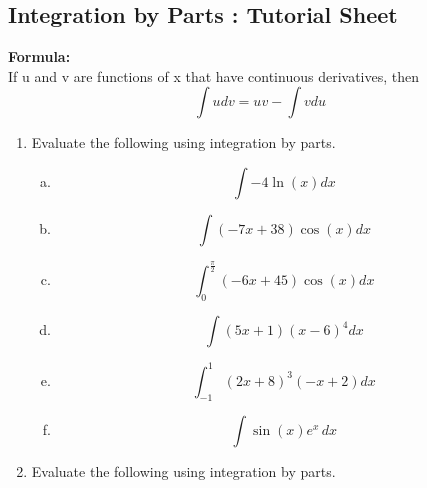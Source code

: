 \documentclass[a4paper,12pt]{article}
\begin{document}
\subsection*{Integration by Parts : Tutorial Sheet}
\begin{framed}
\noindent	\textbf{Formula:} \\ If u and v are functions of x that have continuous derivatives,
	then
	\[\int udv = uv - \int vdu\]
\end{framed}

\begin{enumerate}
\item Evaluate the following using integration by parts.

\begin{multicols}{2}
	\begin{enumerate}[(a)]
		\item \[ \int -4\ln\left(x\right)dx\]
		
		\item \[ \int\left(-7x+38\right)\cos\left(x\right)dx\]
		
		\item  \[\int_0^\frac{\pi}{2}\left(-6x+45\right)\cos\left(x\right)dx\]
		
		
		\item \[ \int\left(5x+1\right)\left(x-6\right)^4 dx\]
		
		
		\item \[ \int_{-1}^1 \left(2x+8\right)^3\left(-x+2\right)dx\]
		
		
		\item \[ \int \sin\left(x\right) e^x\, dx \] 
	\end{enumerate}
\end{multicols}







\item Evaluate the following using integration by parts.


\end{enumerate}
\end{document}
